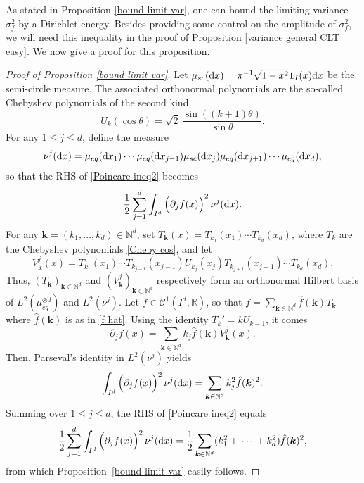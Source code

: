 \documentclass[a4paper,11pt]{article}
\numberwithin{equation}{section}
\theoremstyle{definition}
\newcommand{\eq}{\begin{equation}}
\newcommand{\qe}{\end{equation}}
\newcommand{\N}{\mathbb{N}}
\newcommand{\R}{\mathbb{R}}
\newcommand{\bs}{\boldsymbol}
\renewcommand{\leq}{\leqslant}
\renewcommand{\d}{ {\rm d}}
\def\IND{{\bs 1}}
\begin{document}
As stated in Proposition \ref{bound limit var}, one can bound the limiting
variance $\sigma_f^2$ by a Dirichlet energy. Besides providing some control on
the amplitude of $\sigma_f^2$, we will need this inequality in the proof of
Proposition \ref{variance general CLT easy}. We now give a proof for this proposition.

\begin{proof}[Proof of Proposition \ref{bound limit var}]


Let $\mu_{sc}(\d x)=\pi^{-1}\sqrt{1-x^2}\IND_{I}(x)\d x$ be the semi-circle
measure. The associated orthonormal polynomials are the
so-called Chebyshev polynomials of the second kind
$$U_{k}(\cos \theta) = \sqrt{2}\,\frac{\sin((k+1)\theta)}{\sin\theta}.$$
For any $1\leq j\leq d$, define the measure
$$ \nu^j(\d x) = \mu_{eq}(\d x_1) \cdots \mu_{eq}(\d x_{j-1}) \mu_{sc}(\d x_j)
\mu_{eq}(\d x_{j+1})\cdots  \mu_{eq}(\d x_d),$$
so that the RHS of \eqref{Poincare ineq2} becomes
$$
\frac{1}{2}\sum_{j=1}^d \int_{I^d}  \Big(\partial_j
f(x)\Big)^2 \,\nu^j(\d x).
$$
For any $\bs
  k=(k_1,\ldots,k_d)\in\N^d$,  set $T_{\bs k}(x)= T_{k_1}(x_1)\cdots
  T_{k_d}(x_d)$, where $T_k$ are the Chebyshev polynomials \eqref{Cheby cos},
  and let
$$
V_{\bs k}^j(x) = T_{k_1}(x_1) \cdots T_{k_{j-1}}(x_{j-1}) U_{k_j}(x_j)
T_{k_{j+1}}(x_{j+1})\cdots  T_{k_d}(x_d).
$$
Thus, $(T_{\bs k})_{\bs k\in\N^d}$ and $(V^j_{\bs k})_{\bs k\in\N^d}$ respectively form an
orthonormal Hilbert basis
of $L^2(\mu_{eq}^{\otimes d})$ and $L^2(\nu^j)$. Let $f\in\mathscr C^1(I^d,\R)$, so that
$f=\sum_{\bs k\in\N^d} \hat f(\bs k) T_{\bs k}$ where $\hat f(\bs k)$ is as in \eqref{f
    hat}. Using the identity
$T_k'=kU_{k-1}$, it comes
$$
\partial_j f(x) =  \sum_{\bs k\in\N^d} k_j \hat f(\bs k) V_{\bs k}^j(x).
$$
Then, Parseval's identity in $L^2(\nu^j)$ yields
$$
\int_{I^d} \Big(\partial_j
f(x)\Big)^2 \,\nu^j(\d x) = \sum_{\bs k\in\N^d} k_j^2 \hat f(\bs k)^2.
$$
Summing over $1\leq j \leq d$, the RHS of \eqref{Poincare ineq2} equals
\eq
\label{e:identityToProve}
\frac{1}{2}\sum_{j=1}^d \int_{I^d}  \Big(\partial_j
f(x)\Big)^2 \,\nu^j(\d x)
 = \frac 12\sum_{\bs k\in\N^d} (k_1^2+\,
\cdots \,+ k_d^2)\hat f({\bs k})^2,
\qe
from which Proposition~\ref{bound limit var} easily follows.


\end{proof}
\end{document}
